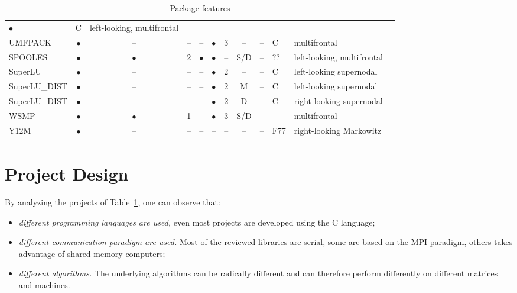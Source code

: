\documentclass[acmtocl]{acmtrans2m}
\begin{document}
\begin{table}
\begin{center}
\begin{tabular}{| l | c c c c | c c c c l l | p{5cm} |}
$\bullet$ & C & left-looking, multifrontal &
\cite{irony04parallel,rotkin04design,rozin04locality} \\
%
UMFPACK     & $\bullet$ & --        & -- & --        & $\bullet$ & 3 & -- & --
& C & multifrontal & \cite{umfpack-home-page} \\
%
SPOOLES     & $\bullet$ & $\bullet$ & 2 & $\bullet$ & $\bullet$ & -- & S/D &
-- & ?? & left-looking, multifrontal & \cite{spooles} \\
%  
SuperLU     & $\bullet$ & --        & -- & --        & $\bullet$ & 2 & -- & --
& C & left-looking supernodal &  \cite{superlu-manual} \\
%
SuperLU\_DIST & $\bullet$ & --        & -- & --        & $\bullet$ & 2 & M & -- & C & left-looking supernodal &  \cite{superlu-manual} \\
SuperLU\_DIST & $\bullet$ & --        & -- & --        & $\bullet$ & 2 & D & -- & C & right-looking supernodal & \cite{superlu-manual} \\
WSMP & $\bullet$ & $\bullet$ & 1 & -- & $\bullet$ & 3 & S/D & -- & -- &
multifrontal & \cite{wsmp} \\
Y12M & $\bullet$ & -- & -- & -- & -- & -- & -- & -- & F77 & right-looking Markowitz & \cite{y12m} \\


\hline
\end{tabular}
\caption{Package features}
\label{tab:packages}
\end{center}
\end{table}


\section{Project Design}
\label{sec:design}

By analyzing the projects of Table~\ref{tab:packages}, one can observe that:
\begin{itemize}
\item {\sl different programming languages are used,} even most projects are
developed using the C language;

\item {\sl different communication paradigm are used.} 
 Most of the reviewed libraries are serial, some are based on the MPI
 paradigm, others takes advantage of shared memory computers;

\item {\sl different algorithms.} The underlying algorithms can be radically
different and can therefore perform differently on different matrices and
machines.
\end{itemize}
\end{document}
